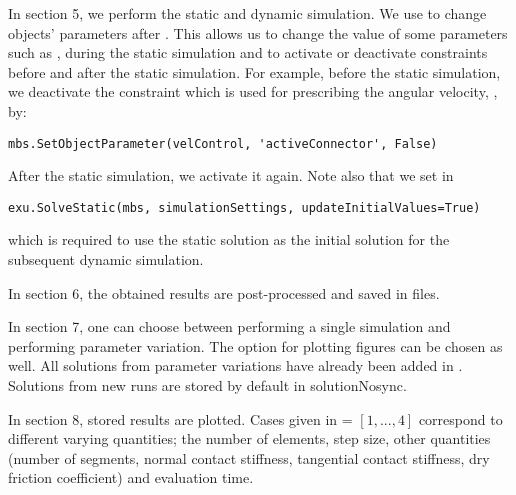 \item{In section 5, we perform the static and dynamic simulation. %
We use  to change objects' parameters after . This allows us to change the value of some parameters such as ,  during the static simulation and to activate or deactivate constraints before and after the static simulation.
For example, before the static simulation, we deactivate the constraint which is used for prescribing the angular velocity, , by:
\pythonstyle
\begin{tcolorbox}\begin{lstlisting}
mbs.SetObjectParameter(velControl, 'activeConnector', False)
\end{lstlisting}\end{tcolorbox} 
After the static simulation, we activate it again.
Note also that we set  in 
\pythonstyle
\begin{tcolorbox}\begin{lstlisting}
exu.SolveStatic(mbs, simulationSettings, updateInitialValues=True) 
\end{lstlisting}\end{tcolorbox}
which is required to use the static solution as the initial solution for the subsequent dynamic simulation.}
\item{In section 6, the obtained results are post-processed and saved in files.}
\item{In section 7, one can choose between performing a single simulation and performing parameter variation.
The option for plotting figures can be chosen as well. All solutions from parameter variations have already been added in . Solutions from new runs are stored by default in solutionNosync.} %
\item{In section 8, stored results are plotted. Cases given in  = $[1,..., 4]$ correspond to different varying quantities; the number of elements, step size, other quantities (number of segments, normal contact stiffness, tangential contact stiffness, dry friction coefficient) and evaluation time.}
%

